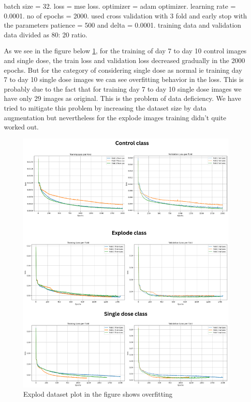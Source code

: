 batch size = 32. loss = mse loss. optimizer = adam optimizer. learning rate = 0.0001. no of epochs = 2000. used cross validation with 3 fold and  early stop with 
the parameters patience = 500 and delta = 0.0001. training data and validation data divided as 80: 20 ratio.

As we see in the figure below \ref{fig:unloss}, for the training of day 7 to day 10 control images and single dose, the train loss and validation loss decreased gradually  in the 2000 epochs. But for the category of considering single dose as normal ie training  day 7 to day 10 single dose images we can see overfitting behavior in the loss. This is probably due to the fact that for training day 7 to day 10 single dose images we have only 29 images as original. This is the problem of data deficiency. We have tried to mitigate this problem by increasing the dataset size by data augmentation but nevertheless for the explode images training didn't quite worked out.
\begin{figure}[H]
  \centering
  \includegraphics[scale=0.5]{figures/overfited.png} 
  \caption{Explod dataset plot in the figure shows overfitting }
  \label{fig:unloss}
\end{figure}

